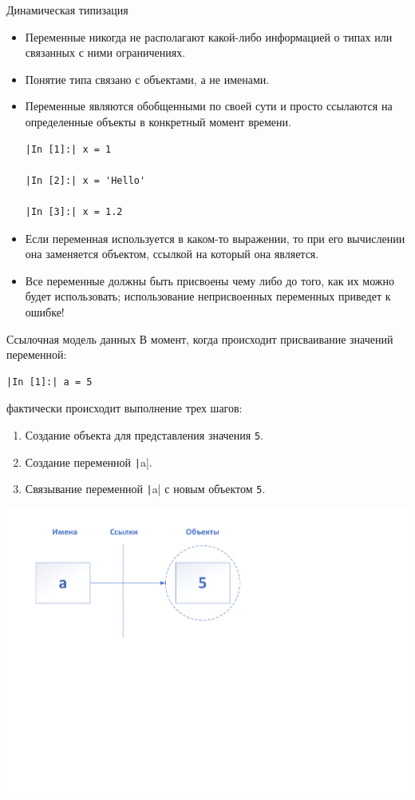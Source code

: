 \documentclass[aspectratio=169, mathserif]{beamer}	%
\begin{document}
\begin{frame}[fragile]{Динамическая типизация}
\scriptsize
\begin{itemize}
	\item Переменные никогда не располагают какой-либо информацией о типах или связанных с ними ограничениях.
	\item Понятие типа связано с объектами, а не именами.
	\item Переменные являются обобщенными по своей сути и просто ссылаются на определенные объекты в конкретный момент времени.

\begin{verbatim}
|In [1]:| x = 1

|In [2]:| x = 'Hello'

|In [3]:| x = 1.2
\end{verbatim}
	\item Если переменная используется в каком-то выражении, то при его вычислении она заменяется объектом, ссылкой на который она является.
	\item Все переменные должны быть присвоены чему либо до того, как их можно будет использовать; использование неприсвоенных переменных приведет к ошибке!
\end{itemize}
\vfill
\end{frame}


\begin{frame}[fragile]{Ссылочная модель данных}
\scriptsize
В момент, когда происходит присваивание значений переменной:
\begin{verbatim}
|In [1]:| a = 5
\end{verbatim}
фактически происходит выполнение трех шагов:

\begin{enumerate}
	\item Создание объекта для представления значения \texttt{5}.
	\item Создание переменной \texttt|a|.
	\item Связывание переменной \texttt|a| с новым объектом \texttt{5}.
\end{enumerate}

\centering
\includegraphics[width=.6\textwidth]{./pics/имена_и_объекты}

\vfill
\end{frame}
\end{document}
